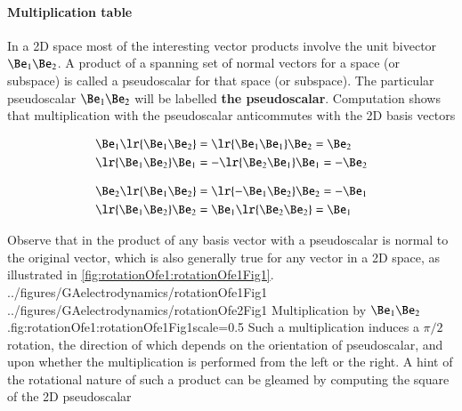 
\paragraph{Multiplication table}

In a 2D space most of the interesting vector products involve the unit bivector \( \Be_1 \Be_2 \).  A product of a spanning set of normal vectors for a space (or subspace) is called a pseudoscalar for that space (or subspace).  The particular pseudoscalar \( \Be_1 \Be_2 \) will be labelled \textbf{the pseudoscalar}.  Computation shows that multiplication with the pseudoscalar anticommutes with the 2D basis vectors

\begin{dmath}\label{eqn:SimpleProducts2:180}
\begin{aligned}
   \Be_1 \lr{ \Be_1 \Be_2 } &= \lr{ \Be_1 \Be_1 } \Be_2 = \Be_2 \\
   \lr{ \Be_1 \Be_2 } \Be_1 &= -\lr{ \Be_2 \Be_1 } \Be_1 = -\Be_2 \\
\end{aligned}
\end{dmath}

\begin{dmath}\label{eqn:SimpleProducts2:200}
\begin{aligned}
   \Be_2 \lr{ \Be_1 \Be_2 } &= \lr{ -\Be_1 \Be_2 } \Be_2 = -\Be_1 \\
   \lr{ \Be_1 \Be_2 } \Be_2 &= \Be_1 \lr{ \Be_2 \Be_2 } = \Be_1 \\
\end{aligned}
\end{dmath}

Observe that in  the product of any basis vector with a pseudoscalar is normal to the original vector, which is also generally true for any vector in a 2D space, as illustrated in \cref{fig:rotationOfe1:rotationOfe1Fig1}.
\imageTwoFigures
{../figures/GAelectrodynamics/rotationOfe1Fig1}
{../figures/GAelectrodynamics/rotationOfe2Fig1}
{Multiplication by \( \Be_1 \Be_2 \).}{fig:rotationOfe1:rotationOfe1Fig1}{scale=0.5}
Such a multiplication induces a \( \pi/2 \) rotation, the direction of which depends on the orientation of pseudoscalar, and upon whether the multiplication is performed from the left or the right.  A hint of the rotational nature of such a product can be gleamed by computing the square of the 2D pseudoscalar

